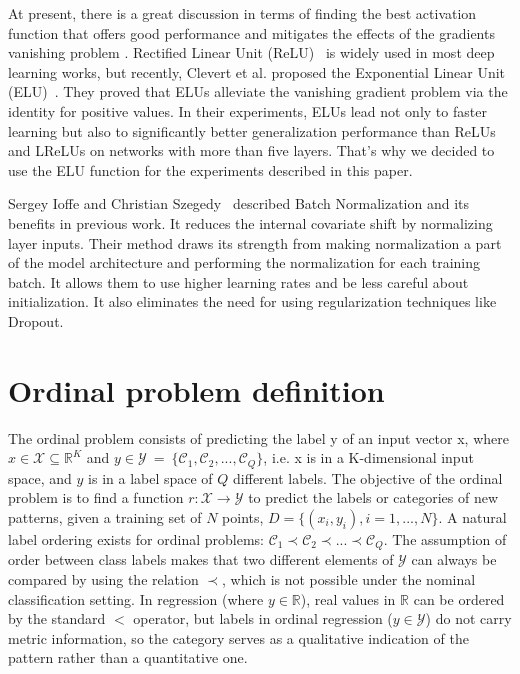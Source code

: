 \documentclass[journal]{IEEEtran}
\begin{document}
	At present, there is a great discussion in terms of finding the best activation function that offers good performance and mitigates the effects of the gradients vanishing problem \cite{bengio1994learning, pascanu2013difficulty}. Rectified Linear Unit (ReLU)~\cite{nair2010rectified} is widely used in most deep learning works, but recently, Clevert et al. proposed the Exponential Linear Unit (ELU)~\cite{clevert2015fast}. They proved that ELUs alleviate the vanishing gradient problem via the identity for positive values. In their experiments, ELUs lead not only to faster learning but also to significantly better generalization performance than ReLUs and LReLUs on networks with more than five layers. That's why we decided to use the ELU function for the experiments described in this paper.
	
	Sergey Ioffe and Christian Szegedy~\cite{ioffe2015batch} described Batch Normalization and its benefits in previous work. It reduces the internal covariate shift by normalizing layer inputs. Their method draws its strength from making normalization a part of the model architecture and performing the normalization for each training batch. It allows them to use higher learning rates and be less careful about initialization. It also eliminates the need for using regularization techniques like Dropout.
	
	\section{Ordinal problem definition}
	\label{sect:ordinalproblem}
	The ordinal problem consists of predicting the label y of an input vector x, where $x \in \mathcal{X} \subseteq \mathds{R}^K$ and $y \in \mathcal{Y}~=~\{\mathcal{C}_1, \mathcal{C}_2, ..., \mathcal{C}_Q\}$, i.e. x is in a K-dimensional input space, and $y$ is in a label space of $Q$ different labels. The objective of the ordinal problem is to find a function $r : \mathcal{X} \rightarrow \mathcal{Y}$ to predict the labels or categories of new patterns, given a training set of $N$ points, $D = \{(x_i, y_i), i = 1, ..., N\}$. A natural label ordering exists for ordinal problems: $\mathcal{C}_1 \prec \mathcal{C}_2 \prec ... \prec \mathcal{C}_Q$. The assumption of order between class labels makes that two different elements of $\mathcal{Y}$ can always be compared by using the relation $\prec$, which is not possible under the nominal classification setting. In regression (where $y \in \mathds{R}$), real values in $\mathds{R}$ can be ordered by the standard $<$ operator, but labels in ordinal regression ($y \in \mathcal{Y}$) do not carry metric information, so the category serves as a qualitative indication of the pattern rather than a quantitative one.
	
\end{document}
